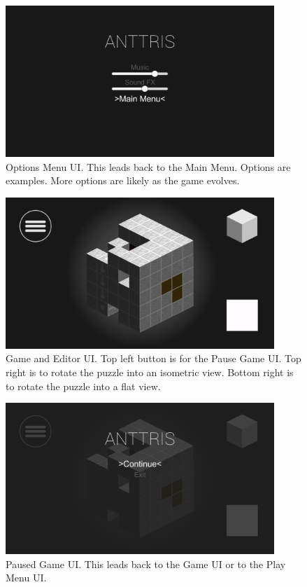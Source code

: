 \documentclass[12pt]{article}
\begin{document}
    \begin{figure}[H]
        \centering
        \includegraphics[width=4in]{OptionsMenu.png}
        \caption{Options Menu UI. This leads back to the Main Menu. Options are examples. More options are likely as the game evolves.}
    \end{figure}
	\begin{figure}[H]
        \centering
        \includegraphics[width=4in]{GameUI.png}
        \caption{Game and Editor UI. Top left button is for the Pause Game UI. Top right is to rotate the puzzle into an isometric view. Bottom right is to rotate the puzzle into a flat view.}
    \end{figure}
    \begin{figure}[H]
        \centering
        \includegraphics[width=4in]{GamePauseUI.png}
        \caption{Paused Game UI. This leads back to the Game UI or to the Play Menu UI. }
    \end{figure}
\end{document}
